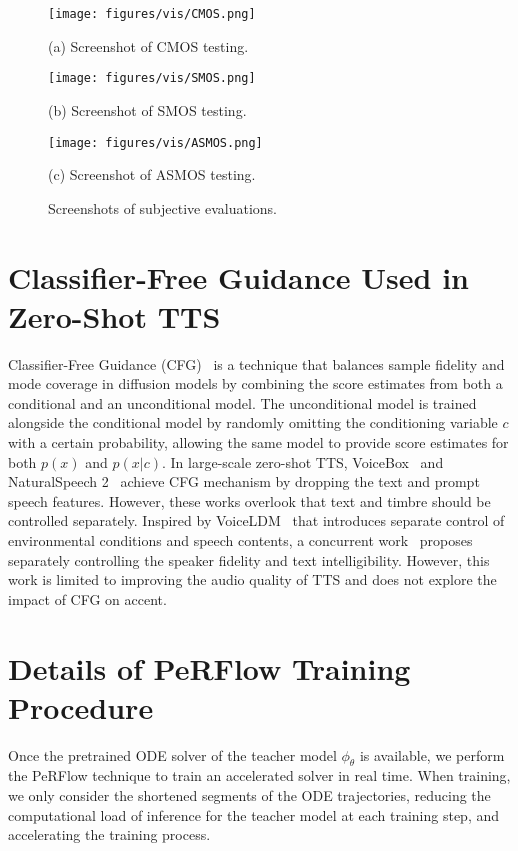 \begin{figure*}[!ht]
    \centering
	\begin{minipage}{0.85\linewidth}
		\centering
		\texttt{[image: figures/vis/CMOS.png]}
		\caption*{(a)  Screenshot of CMOS testing.}
	\end{minipage}
	\centering
	\begin{minipage}{0.85\linewidth}
		\centering
		\texttt{[image: figures/vis/SMOS.png]}
		\caption*{(b) Screenshot of SMOS testing.}
	\end{minipage}
	\centering
	\begin{minipage}{0.85\linewidth}
		\centering
		\texttt{[image: figures/vis/ASMOS.png]}
		\caption*{(c) Screenshot of ASMOS testing.}
	\end{minipage}
	\centering
	\caption{Screenshots of subjective evaluations.}
	\label{screenshots_subjective_evaluations}
\end{figure*}

\section{Classifier-Free Guidance Used in Zero-Shot TTS}
\label{app:CFG_in_zs_tts}
Classifier-Free Guidance (CFG)~\citep{ho2022classifier} is a technique that balances sample fidelity and mode coverage in diffusion models by combining the score estimates from both a conditional and an unconditional model. The unconditional model is trained alongside the conditional model by randomly omitting the conditioning variable $c$ with a certain probability, allowing the same model to provide score estimates for both $p(x)$ and $p(x|c)$. In large-scale zero-shot TTS, VoiceBox~\citep{le2023Voicebox} and NaturalSpeech 2~\citep{shen2023naturalspeech} achieve CFG mechanism by dropping the text and prompt speech features. However, these works overlook that text and timbre should be controlled separately. Inspired by VoiceLDM~\citep{lee2024voiceldm} that introduces separate control of environmental conditions and speech contents, a concurrent work~\citep{yang2024dualspeech} proposes separately controlling the speaker fidelity and text intelligibility. However, this work is limited to improving the audio quality of TTS and does not explore the impact of CFG on accent.


\section{Details of PeRFlow Training Procedure}
\label{app:details_perflow_training}
Once the pretrained ODE solver of the teacher model $\phi_{\theta}$ is available, we perform the PeRFlow technique to train an accelerated solver in real time. When training, we only consider the shortened segments of the ODE trajectories, reducing the computational load of inference for the teacher model at each training step, and accelerating the training process. 

